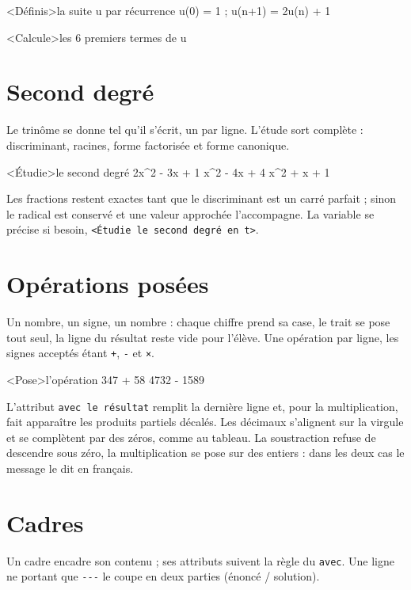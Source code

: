 \documentclass[11pt,a4paper]{article}
\newcommand{\bal}[1]{\texttt{#1}}
\begin{document}
\begin{code}
<Définis>la suite u par récurrence{
    u(0) = 1 ; u(n+1) = 2u(n) + 1
}

<Calcule>les 6 premiers termes de u
\end{code}

\section{Second degré}

Le trinôme se donne tel qu'il s'écrit, un par ligne. L'étude sort
complète : discriminant, racines, forme factorisée et forme canonique.

\begin{code}
<Étudie>le second degré{
    2x^2 - 3x + 1
    x^2 - 4x + 4
    x^2 + x + 1
}
\end{code}

Les fractions restent exactes tant que le discriminant est un carré
parfait ; sinon le radical est conservé et une valeur approchée
l'accompagne. La variable se précise si besoin, \bal{<Étudie le second
degré en t>}.

\section{Opérations posées}

Un nombre, un signe, un nombre : chaque chiffre prend sa case, le trait se
pose tout seul, la ligne du résultat reste vide pour l'élève. Une
opération par ligne, les signes acceptés étant \bal{+}, \bal{-} et
\bal{×}.

\begin{code}
<Pose>l'opération{
    347 + 58
    4732 - 1589
}
\end{code}

L'attribut \bal{avec le résultat} remplit la dernière ligne et, pour la
multiplication, fait apparaître les produits partiels décalés. Les
décimaux s'alignent sur la virgule et se complètent par des zéros, comme
au tableau. La soustraction refuse de descendre sous zéro, la
multiplication se pose sur des entiers : dans les deux cas le message le
dit en français.

\section{Cadres}

Un cadre encadre son contenu ; ses attributs suivent la règle du
\bal{avec}. Une ligne ne portant que \bal{-{}-{}-} le coupe en deux
parties (énoncé / solution).
\end{document}
